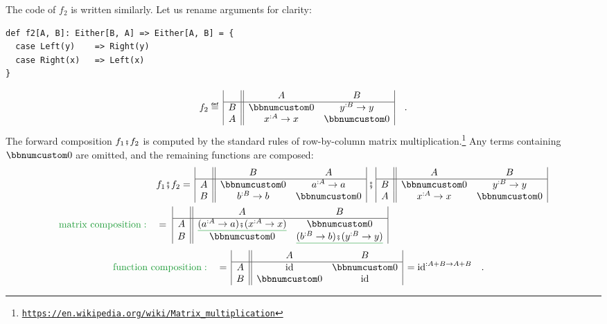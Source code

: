 The code of $f_{2}$ is written similarly. Let us rename arguments
for clarity:\hfill{}
\begin{lstlisting}
def f2[A, B]: Either[B, A] => Either[A, B] = {
  case Left(y)    => Right(y)
  case Right(x)   => Left(x)
}
\end{lstlisting}
\[
f_{2}\triangleq\,\begin{array}{|c||cc|}
 & A & B\\
\hline B & \bbnum 0 & y^{:B}\rightarrow y\\
A & x^{:A}\rightarrow x & \bbnum 0
\end{array}\quad.
\]
The forward composition $f_{1}\bef f_{2}$ is computed by the standard
rules of row-by-column matrix multiplication.\footnote{\texttt{\href{https://en.wikipedia.org/wiki/Matrix_multiplication}{https://en.wikipedia.org/wiki/Matrix\_multiplication}}}
Any terms containing $\bbnum 0$ are omitted, and the remaining functions
are composed:
\begin{align*}
 & f_{1}\bef f_{2}=\,\begin{array}{|c||cc|}
 & B & A\\
\hline A & \bbnum 0 & a^{:A}\rightarrow a\\
B & b^{:B}\rightarrow b & \bbnum 0
\end{array}\,\bef\,\begin{array}{|c||cc|}
 & A & B\\
\hline B & \bbnum 0 & y^{:B}\rightarrow y\\
A & x^{:A}\rightarrow x & \bbnum 0
\end{array}\\
{\color{greenunder}\text{matrix composition}:}\quad & =\,\,\begin{array}{|c||cc|}
 & A & B\\
\hline A & \gunderline{(a^{:A}\rightarrow a)\bef(x^{:A}\rightarrow x)} & \bbnum 0\\
B & \bbnum 0 & \gunderline{(b^{:B}\rightarrow b)\bef(y^{:B}\rightarrow y)}
\end{array}
\end{align*}
\begin{align*}
{\color{greenunder}\text{function composition}:}\quad & =\,\begin{array}{|c||cc|}
 & A & B\\
\hline A & \text{id} & \bbnum 0\\
B & \bbnum 0 & \text{id}
\end{array}\,=\text{id}^{:A+B\rightarrow A+B}\quad.
\end{align*}

